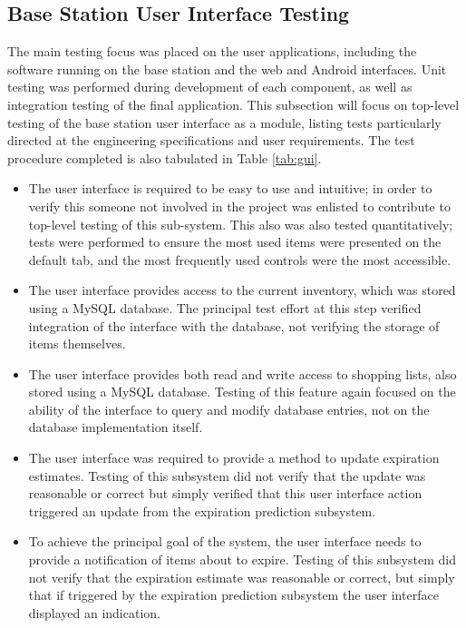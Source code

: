 \documentclass[11pt]{article} %
\begin{document}
\subsection{Base Station User Interface Testing}
The main testing focus was placed on the user applications, including the software running on the base station and the web and Android interfaces.  Unit testing was performed during development of each component, as well as integration testing of the final application. This subsection will focus on top-level testing of the base station user interface as a module, listing tests particularly directed at the engineering specifications and user requirements. The test procedure completed is also tabulated in Table \ref{tab:gui}.
\begin{itemize}
\item The user interface is required to be easy to use and intuitive; in order to verify this someone not involved in the project was enlisted to contribute to top-level testing of this sub-system. This also was also tested quantitatively; tests were performed to ensure the most used items were presented on the default tab, and the most frequently used controls were the most accessible.
\item The user interface provides access to the current inventory, which was stored using a MySQL database. The principal test effort at this step verified integration of the interface with the database, not verifying the storage of items themselves.
\item The user interface provides both read and write access to shopping lists, also stored using a MySQL database. Testing of this feature again focused on the ability of the interface to query and modify database entries, not on the database implementation itself.
\item The user interface was required to provide a method to update expiration estimates. Testing of this subsystem did not verify that the update was reasonable or correct but simply verified that this user interface action triggered an update from the expiration prediction subsystem.
\item To achieve the principal goal of the system, the user interface needs to provide a notification of items about to expire. Testing of this subsystem did not verify that the expiration estimate was reasonable or correct, but simply that if triggered by the expiration prediction subsystem the user interface displayed an indication.
\end{itemize}
\end{document}
